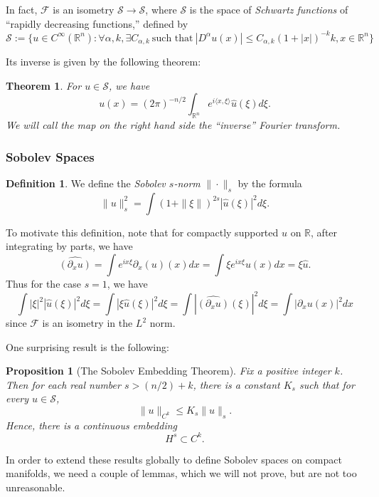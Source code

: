 \documentclass[14pt, reqno]{extarticle}
\theoremstyle{plain}
\newtheorem{theorem}{Theorem}[section]
\newtheorem{proposition}{Proposition}[section]
\theoremstyle{definition}
\newtheorem{definition}{Definition}[section]
\theoremstyle{remark}
\newcommand{\RR}{\mathbb{R}}
\begin{document}
In fact, $\mathcal{F}$ is an isometry $\mathscr{S} \to \mathscr{S}$, where $\mathscr{S}$ 
is the space of \textit{Schwartz functions} of ``rapidly decreasing functions,'' 
defined by
\[
    \mathscr{S} := \{u \in C^\infty(\RR^n): \forall \alpha, k, \exists C_{\alpha,k}\ \text{such that}
    \ |D^\alpha u(x)| \leq C_{\alpha,k}{(1 + |x|)}^{-k}k, x \in \RR^n\}
\]

Its inverse is given by the following theorem:

\begin{theorem}
    For $u \in \mathscr{S}$, we have
    \[
        u(x) = (2\pi)^{-n/2}\int_{\RR^n}e^{i\langle x,\xi\rangle} \widehat{u}(\xi)d\xi.
    \]
    We will call the map on the right hand side the ``inverse'' Fourier transform.
\end{theorem}

\subsubsection{Sobolev Spaces}

\begin{definition}
    We define the \textit{Sobolev $s$-norm} $\|\cdot\|_s$ by the formula
    \[
        \|u\|_s^2 = \int (1 + \|\xi\|)^{2s}|\hat{u}(\xi)|^2 d\xi.
    \]
\end{definition}

To motivate this definition, note that for compactly supported $u$ on $\RR$, after integrating by parts, we have
\[
    \widehat{(\partial_{x}u)} = \int e^{ix\xi} \partial_{x}(u)(x)dx
    = \int \xi e^{ix\xi} u(x) dx = \xi \hat{u}.
\]
Thus for the case $s = 1$, we have
\[
    \int |\xi|^2|\hat{u}(\xi)|^2d\xi = \int {|\xi\hat{u}(\xi)|}^2d\xi = \int {|\widehat{(\partial_x u)}(\xi)|}^2d\xi 
    = \int {|\partial_x u(x)|}^2 dx
\]
since $\mathcal{F}$ is an isometry in the $L^2$ norm. 

One surprising result is the following:

\begin{proposition}[The Sobolev Embedding Theorem]
    Fix a positive integer $k$. Then for each real number $s > (n/2) + k$, there is a constant
    $K_s$ such that for every $u \in \mathscr{S}$, 
    \[
        \|u\|_{C^k} \leq K_s \|u\|_s.
    \]
    Hence, there is a continuous embedding 
    \[
        H^s \subset C^k.
    \]
\end{proposition}

In order to extend these results globally to define Sobolev spaces on compact manifolds, 
we need a couple of lemmas, which we will not prove, but are not too unreasonable. 
\end{document}
